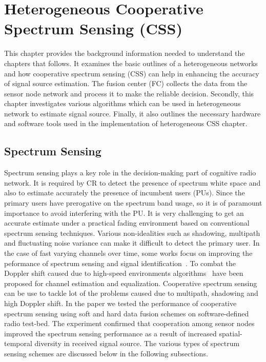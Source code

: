 \chapter{Heterogeneous Cooperative Spectrum Sensing (CSS)}
\label{chapter3}

This chapter provides the background information needed to understand the chapters that follows. It examines the basic outlines of a heterogeneous networks and how cooperative spectrum sensing (CSS) can help in enhancing the accuracy of signal source estimation. The fusion center (FC) collects the data from the sensor node network and process it to make the reliable decision. Secondly, this chapter investigates various algorithms which can be used in heterogeneous network to estimate signal source. Finally, it also outlines the necessary hardware and software tools used in the implementation of heterogeneous CSS chapter.

\section{Spectrum Sensing}
Spectrum sensing plays a key role in the decision-making part of cognitive radio network. It is required by CR to detect the presence of spectrum white space and also to estimate accurately the presence of incumbent users (PUs). Since the primary users have prerogative on the spectrum band usage, so it is of paramount importance to avoid interfering with the PU. It is very challenging to get an accurate estimate under a practical fading environment based on conventional spectrum sensing techniques. Various non-idealities such as shadowing, multipath and fluctuating noise variance can make it difficult to detect the primary user. In the case of fast  varying  channels over time, some works focus on improving the peformance of spectrum sensing and signal identification~\cite{hassan2012blind,kharbech2013blind,hassan2009automatic}. To combat the Doppler shift caused due to high-speed environments algorithms~\cite{simon2013iterative} have been proposed for channel estimation and equalization. Cooperative spectrum sensing~\cite{ksgill} can be use to tackle lot of the problems caused due to multipath, shadowing and high Doppler shift. In the paper we tested the performance of cooperative spectrum sensing using soft and hard data fusion schemes on software-defined radio test-bed. The experiment confirmed that cooperation among sensor nodes improved the spectrum sensing performance as a result of increased spatial-temporal diversity in received signal source. The various types of spectrum sensing schemes are discussed below in the following subsections.

